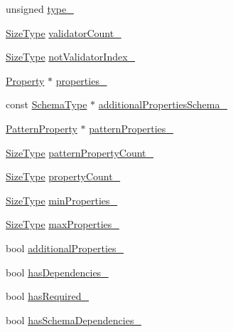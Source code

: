\begin{DoxyCompactItemize}
\item 
unsigned \hyperlink{classinternal_1_1Schema_a8cb3b7bb26a233adfea17d80ba64aeef}{type\+\_\+}
\item 
\hyperlink{rapidjson_8h_a5ed6e6e67250fadbd041127e6386dcb5}{Size\+Type} \hyperlink{classinternal_1_1Schema_a33da447b04096e0188476f4cf7f1585a}{validator\+Count\+\_\+}
\item 
\hyperlink{rapidjson_8h_a5ed6e6e67250fadbd041127e6386dcb5}{Size\+Type} \hyperlink{classinternal_1_1Schema_a07e918a892902e0280312f33aa5d539e}{not\+Validator\+Index\+\_\+}
\item 
\hyperlink{structinternal_1_1Schema_1_1Property}{Property} $\ast$ \hyperlink{classinternal_1_1Schema_a6a74a3682659e92f73c4e70a91e4ec1c}{properties\+\_\+}
\item 
const \hyperlink{classinternal_1_1Schema_ac2556ebf7a7db971e1c1c0f76eb5786e}{Schema\+Type} $\ast$ \hyperlink{classinternal_1_1Schema_a8129106a08ec66709237f4ee42c55690}{additional\+Properties\+Schema\+\_\+}
\item 
\hyperlink{structinternal_1_1Schema_1_1PatternProperty}{Pattern\+Property} $\ast$ \hyperlink{classinternal_1_1Schema_a9d9511472763ee8bff186d524e5f74a8}{pattern\+Properties\+\_\+}
\item 
\hyperlink{rapidjson_8h_a5ed6e6e67250fadbd041127e6386dcb5}{Size\+Type} \hyperlink{classinternal_1_1Schema_ad0deaa0bc5e23815d1e5d937694d110a}{pattern\+Property\+Count\+\_\+}
\item 
\hyperlink{rapidjson_8h_a5ed6e6e67250fadbd041127e6386dcb5}{Size\+Type} \hyperlink{classinternal_1_1Schema_adf582d05aa0e8692b610f129134dbae1}{property\+Count\+\_\+}
\item 
\hyperlink{rapidjson_8h_a5ed6e6e67250fadbd041127e6386dcb5}{Size\+Type} \hyperlink{classinternal_1_1Schema_aafacefd65ac029a9be75fd0e4df8f6f4}{min\+Properties\+\_\+}
\item 
\hyperlink{rapidjson_8h_a5ed6e6e67250fadbd041127e6386dcb5}{Size\+Type} \hyperlink{classinternal_1_1Schema_a6a1a5b6f69650dc2d3766427544f8e94}{max\+Properties\+\_\+}
\item 
bool \hyperlink{classinternal_1_1Schema_a1aa6a6276158b7b41e8a2aa553d701be}{additional\+Properties\+\_\+}
\item 
bool \hyperlink{classinternal_1_1Schema_ae918428f55f1ad36a94ec377e1436e5c}{has\+Dependencies\+\_\+}
\item 
bool \hyperlink{classinternal_1_1Schema_ad6cb5137e20f36267efc52373ffcd53c}{has\+Required\+\_\+}
\item 
bool \hyperlink{classinternal_1_1Schema_ab1f5c3de1e83368f044b08f571186a9c}{has\+Schema\+Dependencies\+\_\+}

\end{DoxyCompactItemize}

